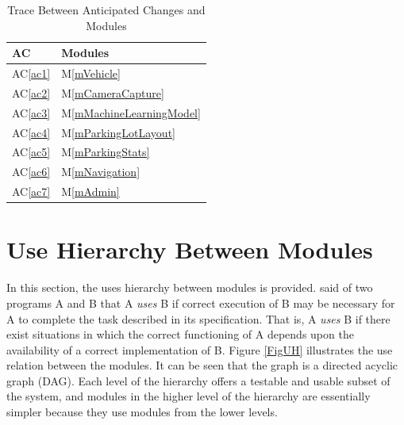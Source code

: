 \documentclass[12pt, titlepage]{article}
\newcommand{\acref}[1]{AC\ref{#1}}
\newcommand{\mref}[1]{M\ref{#1}}
\begin{document}
\begin{table}[H]
\centering
\begin{tabular}{p{} p{}}
\toprule
\textbf{AC} & \textbf{Modules}\\
\midrule
\acref{ac1} & \mref{mVehicle}\\
\acref{ac2} & \mref{mCameraCapture}\\
\acref{ac3} & \mref{mMachineLearningModel}\\
\acref{ac4} & \mref{mParkingLotLayout}\\
\acref{ac5} & \mref{mParkingStats}\\
\acref{ac6} & \mref{mNavigation}\\
\acref{ac7} & \mref{mAdmin}\\
\bottomrule
\end{tabular}
\caption{Trace Between Anticipated Changes and Modules}
\label{TblACT}
\end{table}
\color{red}
\section{Use Hierarchy Between Modules} \label{SecUse}
\color{black}
In this section, the uses hierarchy between modules is provided.
\cite{Parnas1978} said of two programs A and B that A {\em uses} B if correct
execution of B may be necessary for A to complete the task described in its
specification. That is, A {\em uses} B if there exist situations in which the
correct functioning of A depends upon the availability of a correct
implementation of B.  Figure \ref{FigUH} illustrates the use relation between
the modules. It can be seen that the graph is a directed acyclic graph (DAG).
Each level of the hierarchy offers a testable and usable subset of the system,
and modules in the higher level of the hierarchy are essentially simpler because
they use modules from the lower levels.
\end{document}
